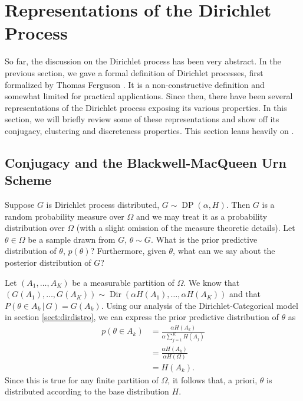\documentclass[final,3p,times,twocolumn]{elsarticle}
\DeclareMathOperator*{\Dir}{Dir}
\DeclareMathOperator*{\DP}{DP}
\begin{document}
\section{Representations of the Dirichlet Process}
\label{sect:representations}
So far, the discussion on the Dirichlet process has been very abstract.
In the previous section, we gave a formal definition of Dirichlet processes, first formalized by Thomas Ferguson \cite{ferguson1973}.
It is a non-constructive definition and somewhat limited for practical applications.
Since then, there have been several representations of the Dirichlet process exposing its various properties.
In this section, we will briefly review some of these representations and show off its conjugacy, clustering and discreteness properties.
This section leans heavily on \cite{Teh2010a}.

\subsection{Conjugacy and the Blackwell-MacQueen Urn Scheme}
Suppose $G$ is Dirichlet process distributed, $G \sim \DP(\alpha,H)$.
Then $G$ is a random probability measure over $\Omega$ and we may treat it as a probability distribution over $\Omega$ (with a slight omission of the measure theoretic details).
Let $\theta \in \Omega$ be a sample drawn from $G$, $\theta \sim G$.
What is the prior predictive distribution of $\theta$, $p(\theta)$? Furthermore, given $\theta$, what can we say about the posterior distribution of $G$?

Let $(A_1,\dots,A_K)$ be a measurable partition of $\Omega$. 
We know that $(G(A_1),\dots,G(A_K))\sim \Dir(\alpha H(A_1),\dots,\alpha H(A_K))$ and that $P(\theta \in A_k \,|\, G) = G(A_k)$.
Using our analysis of the Dirichlet-Categorical model in section \ref{sect:dirdistro}, we can express the prior predictive distribution of $\theta$ as
\begin{equation}
\label{eqn:dppriorpredictive}
\begin{split}
p(\theta \in A_k) &= \frac{\alpha H(A_k)}{\alpha \sum_{j=1}^K H(A_j)}\\
&= \frac{\alpha H(A_k)}{\alpha H(\Omega)}\\
&= H(A_k).
\end{split}
\end{equation}
Since this is true for any finite partition of $\Omega$, it follows that, a priori, $\theta$ is distributed according to the base distribution $H$.
\end{document}
